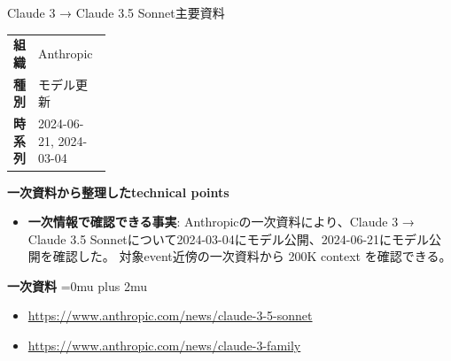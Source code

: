 \begin{technicalnote}{Claude 3 → Claude 3.5 Sonnet}{主要資料}
\begingroup
\begin{tabularx}{\linewidth}{@{}>{\bfseries}p{0.22\linewidth}X@{}}
組織 & Anthropic \\
種別 & モデル更新 \\
時系列 & 2024-06-21, 2024-03-04 \\
\end{tabularx}
\smallskip
\begin{minipage}{\linewidth}
{\bfseries 一次資料から整理したtechnical points}
\begin{itemize}[leftmargin=1.5em,itemsep=0.35em]
\item \textbf{一次情報で確認できる事実}: Anthropicの一次資料により、Claude 3 → Claude 3.5 Sonnetについて2024-03-04にモデル公開、2024-06-21にモデル公開を確認した。 対象event近傍の一次資料から 200K context を確認できる。
\end{itemize}
\begin{minipage}{\linewidth}
\begin{samepage}
{\bfseries 一次資料}
\begingroup\sloppy
\Urlmuskip=0mu plus 2mu\relax
\begin{itemize}[leftmargin=1.5em,itemsep=0.25em]
\item {\scriptsize\url{https://www.anthropic.com/news/claude-3-5-sonnet}}
\item {\scriptsize\url{https://www.anthropic.com/news/claude-3-family}}
\end{itemize}
\endgroup
\end{samepage}
\end{minipage}
\end{minipage}
\endgroup
\end{technicalnote}
\medskip

